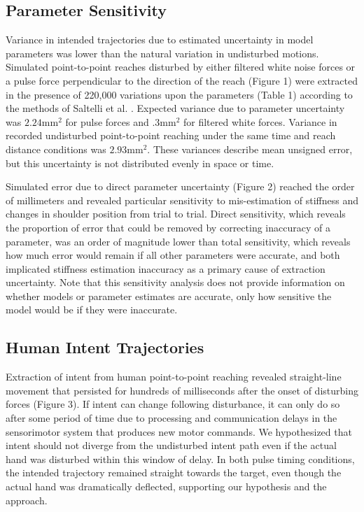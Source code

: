 \subsection*{Parameter Sensitivity}
Variance in intended trajectories due to estimated uncertainty in model parameters was lower than the natural variation in undisturbed motions. Simulated point-to-point reaches disturbed by either filtered white noise forces or a pulse force perpendicular to the direction of the reach (Figure 1) were extracted in the presence of 220,000 variations upon the parameters (Table 1) according to the methods of Saltelli et al. \cite{saltelli2010variance}. Expected variance due to parameter uncertainty was $2.24 \mathrm{mm}^2$ for pulse forces and $.3 \mathrm{mm}^2$ for filtered white forces. Variance in recorded undisturbed point-to-point reaching under the same time and reach distance conditions was $2.93 \mathrm{mm}^2$. These variances describe mean unsigned error, but this uncertainty is not distributed evenly in space or time.

Simulated error due to direct parameter uncertainty (Figure 2) reached the order of millimeters and revealed particular sensitivity to mis-estimation of stiffness and changes in shoulder position from trial to trial. Direct sensitivity, which reveals the proportion of error that could be removed by correcting inaccuracy of a parameter, was an order of magnitude lower than total sensitivity, which reveals how much error would remain if all other parameters were accurate, and both implicated stiffness estimation inaccuracy as a primary cause of extraction uncertainty. Note that this sensitivity analysis does not provide information on whether models or parameter estimates are accurate, only how sensitive the model would be if they were inaccurate. 

\subsection*{Human Intent Trajectories}
Extraction of intent from human point-to-point reaching revealed straight-line movement that persisted for hundreds of milliseconds after the onset of disturbing forces (Figure 3). If intent can change following disturbance, it can only do so after some period of time due to processing and communication delays in the sensorimotor system that produces new motor commands. We hypothesized that intent should not diverge from the undisturbed intent path even if the actual hand was disturbed within this window of delay. In both pulse timing conditions, the intended trajectory remained straight towards the target, even though the actual hand was dramatically deflected, supporting our hypothesis and the approach. 

